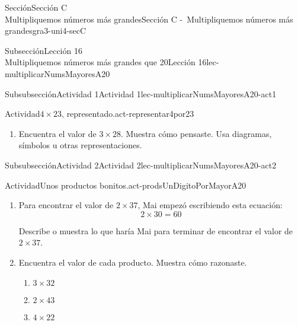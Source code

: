\begin{sectionptx}{Sección}{{\Large Sección C\\}Multipliquemos números más grandes}{}{Sección C -~Multipliquemos números más grandes}{}{}{gra3-uni4-secC}
\begin{subsectionptx}{Subsección}{{\normalsize Lección 16\\[-0.05cm]}Multipliquemos números más grandes que 20}{}{Lección 16}{}{}{lec-multiplicarNumsMayoresA20}
\begin{subsubsectionptx}{Subsubsección}{Actividad 1}{}{Actividad 1}{}{}{lec-multiplicarNumsMayoresA20-act1}
\begin{activity}{Actividad}{\(4\times 23\), representado.}{act-representar4por23}
\begin{enumerate}
\begin{sidebyside}{2}{0}{0.3}{0.05}
\begin{sbspanel}{0.6}[center]
\end{sbspanel}%
\end{sidebyside}%
\begin{sidebyside}{2}{0}{0.3}{0.05}%
\begin{sbspanel}{0.05}[center]%
D%
\end{sbspanel}%
\begin{sbspanel}{0.6}[center]%
\texttt{[image: external/svg-source/tikz-file-152974-scale13.pdf]}
\end{sbspanel}%
\end{sidebyside}%
%
\begin{enumerate}
\item{}¿Qué observas sobre los números de sus diagramas?%
\item{}¿Cuál diagrama usarías para encontrar el valor de \(4\times 23\)? Explica tu razonamiento.%
\end{enumerate}
\item{}Encuentra el valor de \(3\times 28\). Muestra cómo pensaste. Usa diagramas, símbolos u otras representaciones.%
\end{enumerate}
\end{activity}%
\end{subsubsectionptx}
%
%
\typeout{************************************************}
\typeout{************************************************}
%
\clearpage
\begin{subsubsectionptx}{Subsubsección}{Actividad 2}{}{Actividad 2}{}{}{lec-multiplicarNumsMayoresA20-act2}
\begin{activity}{Actividad}{Unos productos bonitos.}{act-prodsUnDigitoPorMayorA20}%
%
\begin{enumerate}
\item{}Para encontrar el valor de \(2\times 37\), Mai empezó escribiendo esta ecuación:%
\begin{equation*}
2 \times 30 = 60
\end{equation*}
%
\par
Describe o muestra lo que haría Mai para terminar de encontrar el valor de \(2\times 37\).%
\clearpage
\item{}Encuentra el valor de cada producto. Muestra cómo razonaste.%
%
\begin{enumerate}
\item{}\(\displaystyle 3\times 32\)%
\item{}\(\displaystyle 2\times 43\)%
\item{}\(\displaystyle 4\times 22\)%

\end{enumerate}
\end{enumerate}
\end{activity}
\end{subsubsectionptx}
\end{subsectionptx}
\end{sectionptx}
